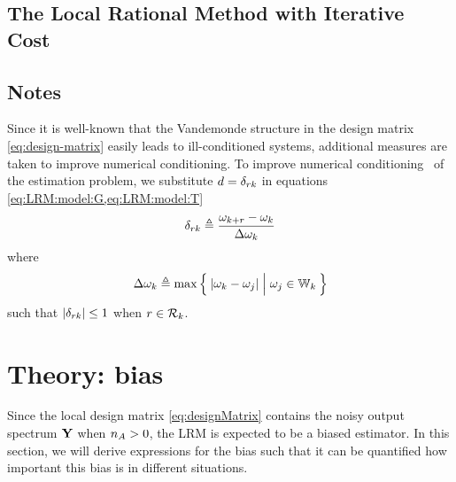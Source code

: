 
\subsection{The Local Rational Method with Iterative Cost}

\subsection{Notes}

Since it is well-known that the Vandemonde structure in the design matrix \eqref{eq:design-matrix} easily leads to ill-conditioned systems, additional measures are taken to improve numerical conditioning.
To improve numerical conditioning~\citep{Pintelon2005} of the estimation problem, we substitute $d = \delta_{rk}$ in equations \eqref{eq:LRM:model:G,eq:LRM:model:T}
\begin{equation}
\delta_{rk} \triangleq \frac{\omega_{k+r} - \omega_k}{\Delta \omega_k}
\label{eq:freqScaling}
\end{equation}
where
\begin{equation}
  \Delta \omega_k \isdef
  \max
  \Set{
    \abs{ \omega_k - \omega_j} |  \vphantom{\frac{a}{b}}  \omega_j \in \LocalWindow[k]
  }
\end{equation}
such that $\left| \delta_{rk} \right| \leq 1$ when $r \in \mathcal{R}_{k}$.



\section{Theory: bias}
\label{sec:biascalc}
Since the local design matrix \eqref{eq:designMatrix} contains the noisy output spectrum $\mathbf{Y}$ when $n_{A} > 0$, the \gls{LRM} is expected to be a biased estimator.
In this section, we will derive expressions for the bias such that it can be quantified how important this bias is in different situations.

